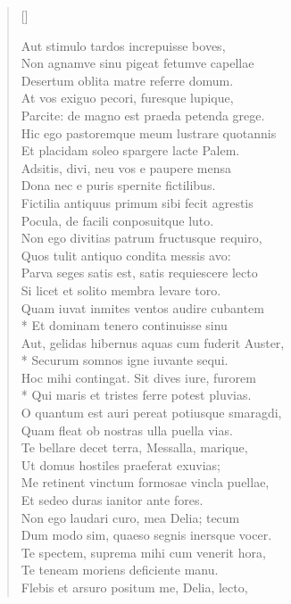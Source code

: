 \begin{verse}[\versewidth]
\begin{altverse}
{Aut stimulo tardos increpuisse boves,\\
Non agnamve sinu pigeat fetumve capellae\\
Desertum oblita matre referre domum.\\
At vos exiguo pecori, furesque lupique,\\
Parcite: de magno est praeda petenda grege.\\
Hic ego pastoremque meum lustrare quotannis\\
Et placidam soleo spargere lacte Palem.\\
Adsitis, divi, neu vos e paupere mensa\\
Dona nec e puris spernite fictilibus.\\
Fictilia antiquus primum sibi fecit agrestis\\
Pocula, de facili conposuitque luto.\\
Non ego divitias patrum fructusque requiro,\\
Quos tulit antiquo condita messis avo:\\
Parva seges satis est, satis requiescere lecto\\
Si licet et solito membra levare toro.\\
Quam iuvat inmites ventos audire cubantem\\*
Et dominam tenero continuisse sinu\\
Aut, gelidas hibernus aquas cum fuderit Auster,\\*
Securum somnos igne iuvante sequi.\\
Hoc mihi contingat. Sit dives iure, furorem\\*
Qui maris et tristes ferre potest pluvias.\\
O quantum est auri pereat potiusque smaragdi,\\
Quam fleat ob nostras ulla puella vias.\\
Te bellare decet terra, Messalla, marique,\\
Ut domus hostiles praeferat exuvias;\\
Me retinent vinctum formosae vincla puellae,\\
Et sedeo duras ianitor ante fores.\\
Non ego laudari curo, mea Delia; tecum\\
Dum modo sim, quaeso segnis inersque vocer.\\
Te spectem, suprema mihi cum venerit hora,\\
Te teneam moriens deficiente manu.\\
Flebis et arsuro positum me, Delia, lecto,\\
}
\end{altverse}
\end{verse}
